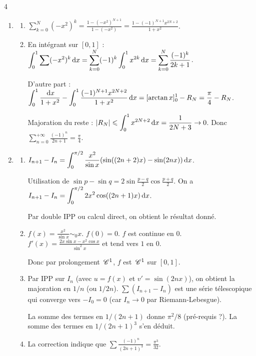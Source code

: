 \begin{correction}{4}
\begin{enumerate}
    \item
    \begin{enumerate}
        \item $\displaystyle \sum_{k=0}^N (-x^2)^k = \frac{1-(-x^2)^{N+1}}{1-(-x^2)} = \frac{1-(-1)^{N+1}x^{2N+2}}{1+x^2}$.
        \item 
            En intégrant sur $[0,1]$ :
            $\displaystyle \int_0^1 \sum (-x^2)^k \,\mathrm{d}x = \sum_{k=0}^N (-1)^k \int_0^1 x^{2k} \,\mathrm{d}x = \sum_{k=0}^N \frac{(-1)^k}{2k+1}$.

            D'autre part : $\displaystyle\int_0^1 \frac{\,\mathrm{d}x}{1+x^2} - \int_0^1 \frac{(-1)^{N+1}x^{2N+2}}{1+x^2} \,\mathrm{d}x = [\arctan x]_0^1 - R_N = \frac{\pi}{4} - R_N$.

            Majoration du reste : $\displaystyle |R_N| \leqslant \int_0^1 x^{2N+2} \,\mathrm{d}x = \frac{1}{2N+3} \to 0$.
            Donc $\displaystyle \sum_{n=0}^{+\infty} \frac{(-1)^n}{2n+1} = \frac{\pi}{4}$.
    \end{enumerate}
    
    \item
    \begin{enumerate}
        \item 
            $\displaystyle I_{n+1}-I_n = \int_0^{\pi/2} \frac{x^2}{\sin x} (\sin((2n+2)x) - \sin(2nx)) \,\mathrm{d}x$.
            
            Utilisation de $\sin p - \sin q = 2 \sin\frac{p-q}{2} \cos\frac{p+q}{2}$.
            On a $\displaystyle I_{n+1}-I_n = \int_0^{\pi/2} 2x^2 \cos((2n+1)x) \,\mathrm{d}x$.

            Par double IPP ou calcul direct, on obtient le résultat donné.

        \item 
            $f(x) = \frac{x^2}{\sin x} \sim_0 x$. $f(0)=0$. $f$ est continue en 0.
            $f'(x) = \frac{2x\sin x - x^2\cos x}{\sin^2 x}$ et tend vers $1$ en $0$.

            Donc par prolongement $\,\mathscr C^{1}$, $f$ est $\,\mathscr C^{1}$ sur $[0,1]$.

        \item
            Par IPP sur $I_n$ (avec $u=f(x)$ et $v'=\sin(2nx)$), on obtient la majoration en $1/n$ (ou $1/2n$).
            $\sum (I_{n+1}-I_n)$ est une série télescopique qui converge vers $-I_0 = 0$ (car $I_n \to 0$ par Riemann-Lebesgue).

            La somme des termes en $1/(2n+1)$ donne $\pi^2/8$ (pré-requis ?). La somme des termes en $1/(2n+1)^3$ s'en déduit.
        
        \item La correction indique que $\sum \frac{(-1)^n}{(2n+1)^3} = \frac{\pi^3}{32}$.
    \end{enumerate}
\end{enumerate}
\end{correction}


